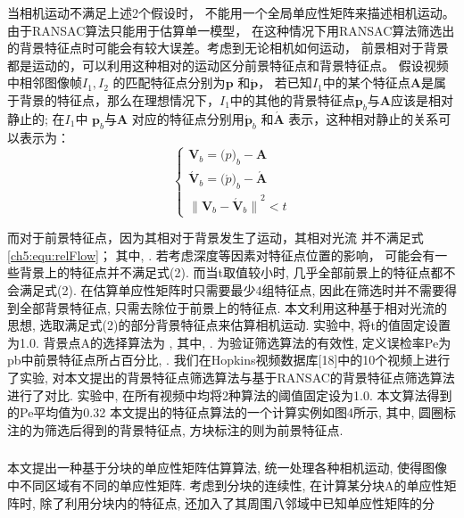 当相机运动不满足上述2个假设时， 不能用一个全局单应性矩阵来描述相机运动。由于RANSAC算法只能用于估算单一模型， 在这种情况下用RANSAC算法筛选出的背景特征点时可能会有较大误差。考虑到无论相机如何运动， 前景相对于背景都是运动的，可以利用这种相对的运动区分前景特征点和背景特征点。 假设视频中相邻图像帧$I_1,I_2$ 的匹配特征点分别为$\mathbf{p}$ 和$\mathbf{\acute{p}}$， 若已知$I_1$中的某个特征点$\mathbf{A}$是属于背景的特征点，那么在理想情况下，$I_1$中的其他的背景特征点$\mathbf{p}_b$与$\mathbf{A}$应该是相对静止的; 在$I_1$中 $\mathbf{p}_b$与$\mathbf{A}$ 对应的特征点分别用$\mathbf{\acute{p}}_b$ 和$\mathbf{\acute{A}}$ 表示，这种相对静止的关系可以表示为：
\begin{equation}
\label{ch5:equ:relFlow}
\begin{cases}
  \mathbf{V}_b = \mathbf(p)_b - \mathbf{A}  \\
   \mathbf{\acute{V}}_b = \mathbf(\acute{p})_b - \mathbf{\acute{A}} \\
{\|\mathbf{V}_b-\mathbf{\acute{V}}_b\|}^2 < t
\end{cases}
\end{equation}
	 	
而对于前景特征点，因为其相对于背景发生了运动，其相对光流 并不满足式\ref{ch5:equ:relFlow}； 其中,  .
若考虑深度等因素对特征点位置的影响， 可能会有一些背景上的特征点并不满足式(2). 而当t取值较小时, 几乎全部前景上的特征点都不会满足式(2). 在估算单应性矩阵时只需要最少4组特征点, 因此在筛选时并不需要得到全部背景特征点, 只需去除位于前景上的特征点. 本文利用这种基于相对光流的思想, 选取满足式(2)的部分背景特征点来估算相机运动. 实验中, 将t的值固定设置为1.0. 背景点A的选择算法为 , 其中,  . 为验证筛选算法的有效性, 定义误检率Pe为pb中前景特征点所占百分比,  .
我们在Hopkins视频数据库[18]中的10个视频上进行了实验, 对本文提出的背景特征点筛选算法与基于RANSAC的背景特征点筛选算法进行了对比. 实验中, 在所有视频中均将2种算法的阈值固定设为1.0. 本文算法得到的Pe平均值为0.32%
本文提出的特征点算法的一个计算实例如图4所示, 其中, 圆圈标注的为筛选后得到的背景特征点, 方块标注的则为前景特征点.

\subsubsection{}
\label{ch5:sec:sub:sub:homography}
本文提出一种基于分块的单应性矩阵估算算法, 统一处理各种相机运动, 使得图像中不同区域有不同的单应性矩阵. 考虑到分块的连续性, 在计算某分块A的单应性矩阵时, 除了利用分块内的特征点, 还加入了其周围八邻域中已知单应性矩阵的分




